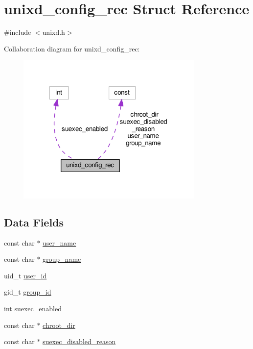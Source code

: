 \hypertarget{structunixd__config__rec}{}\section{unixd\+\_\+config\+\_\+rec Struct Reference}
\label{structunixd__config__rec}


{\ttfamily \#include $<$unixd.\+h$>$}



Collaboration diagram for unixd\+\_\+config\+\_\+rec\+:
\nopagebreak
\begin{figure}[H]
\begin{center}
\leavevmode
\includegraphics[width=261pt]{structunixd__config__rec__coll__graph}
\end{center}
\end{figure}
\subsection*{Data Fields}
\begin{DoxyCompactItemize}
\item 
const char $\ast$ \hyperlink{structunixd__config__rec_a9ad5824ad485ab8146926b852a4ba31b}{user\+\_\+name}
\item 
const char $\ast$ \hyperlink{structunixd__config__rec_a1b29a292ea20ef2e53170ff853574bdb}{group\+\_\+name}
\item 
uid\+\_\+t \hyperlink{structunixd__config__rec_a5a0cb8ffa8a7a2a7f74004988a516280}{user\+\_\+id}
\item 
gid\+\_\+t \hyperlink{structunixd__config__rec_ae75ae4a580c35447cbb69f0bcd0d2d0e}{group\+\_\+id}
\item 
\hyperlink{pcre_8txt_a42dfa4ff673c82d8efe7144098fbc198}{int} \hyperlink{structunixd__config__rec_ad1e0300695719bb0925a9e271e5c3d10}{suexec\+\_\+enabled}
\item 
const char $\ast$ \hyperlink{structunixd__config__rec_a692a2cb78197b083da9d167d8c0ead4a}{chroot\+\_\+dir}
\item 
const char $\ast$ \hyperlink{structunixd__config__rec_ad26f88307c54ee712e0c236dbe0e1834}{suexec\+\_\+disabled\+\_\+reason}
\end{DoxyCompactItemize}


